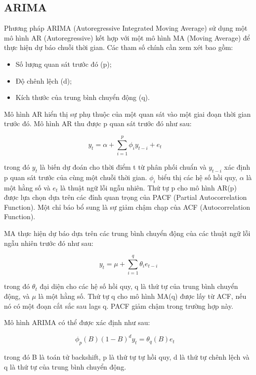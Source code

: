 \subsection{ARIMA}

Phương pháp ARIMA (Autoregressive Integrated Moving Average) sử dụng một mô hình AR (Autoregressive) kết hợp với một mô hình MA (Moving Average) để thực hiện dự báo chuỗi thời gian. Các tham số chính cần xem xét bao gồm:

\begin{itemize}
  \item Số lượng quan sát trước đó (p);
  \item Độ chênh lệch (d);
  \item Kích thước của trung bình chuyển động (q).
\end{itemize}

Mô hình AR hiển thị sự phụ thuộc của một quan sát vào một giai đoạn thời gian trước đó. Mô hình AR thu được p quan sát trước đó như sau:

\[
y_t = \alpha + \sum_{i=1}^{p} \phi_i y_{t-i} + e_t \quad
\]

trong đó \(y_t\) là biến dự đoán cho thời điểm t từ phân phối chuẩn và \(y_{t-i}\) xác định p quan sát trước của cùng một chuỗi thời gian. \(\phi_i\) biểu thị các hệ số hồi quy, \(\alpha\) là một hằng số và \(e_t\) là thuật ngữ lỗi ngẫu nhiên. Thứ tự p cho mô hình AR(p) được lựa chọn dựa trên các đỉnh quan trọng của PACF (Partial Autocorrelation Function). Một chỉ báo bổ sung là sự giảm chậm chạp của ACF (Autocorrelation Function).

MA thực hiện dự báo dựa trên các trung bình chuyển động của các thuật ngữ lỗi ngẫu nhiên trước đó như sau:

\[
y_t = \mu + \sum_{i=1}^{q} \theta_i e_{t-i}
\]

trong đó \(\theta_t\) đại diện cho các hệ số hồi quy, q là thứ tự của trung bình chuyển động, và \(\mu\) là một hằng số. Thứ tự q cho mô hình MA(q) được lấy từ ACF, nếu nó có một đoạn cắt sắc sau lags q. PACF giảm chậm trong trường hợp này.

Mô hình ARIMA có thể được xác định như sau:

\[
\phi_p(B)(1 - B)^d y_t = \theta_q(B) e_t \quad 
\]

trong đó B là toán tử backshift, p là thứ tự tự hồi quy, d là thứ tự chênh lệch và q là thứ tự của trung bình chuyển động.